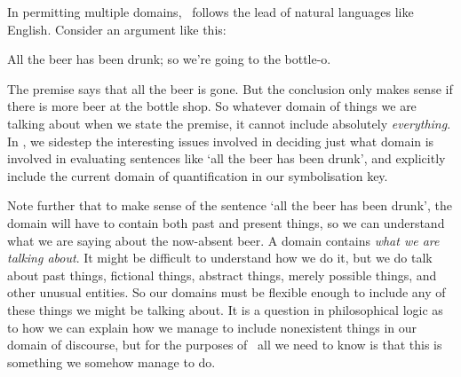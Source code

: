 In permitting multiple domains, \FOL\ follows the lead of natural languages like English. Consider an argument like this: \begin{earg}
	\item[\ex{ex.qdr}] All the beer has been drunk; so we're going to the bottle-o. 
\end{earg} The premise says that all the beer is gone. But the conclusion only makes sense if there is more beer at the bottle shop. So whatever domain of things we are talking about when we state the premise, it cannot include absolutely \emph{everything}. In \FOL, we sidestep the interesting issues involved in deciding just what domain is involved in evaluating sentences like `all the beer has been drunk', and explicitly include the current domain of quantification in our symbolisation key.

Note further that to make sense of the sentence `all the beer has been drunk', the domain will have to contain both past and present things, so we can understand what we are saying about the now-absent beer. A domain contains \emph{what we are talking about}. It might be difficult to understand how we do it, but we do talk about past things, fictional things, abstract things, merely possible things, and other unusual entities. So our domains must be flexible enough to include any of these things we might be talking about. It is a question in philosophical logic as to how we can explain how we manage to include nonexistent things in our domain of discourse, but for the purposes of \FOL\ all we need to know is that this is something we somehow manage to do.




